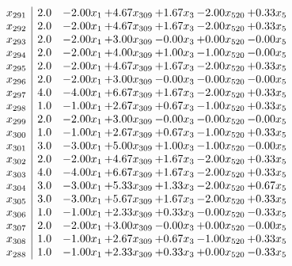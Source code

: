 \documentclass[8pt]{article}
\begin{document}
\[\begin{array}{c| c c@{\hskip 2pt} c@{\hskip 2pt} c@{\hskip 2pt} c@{\hskip 2pt} c@{\hskip 2pt} }
 x_{291}   &  2.0 & -2.00 x_{1} & +  4.67 x_{309} & +  1.67 x_{3} & -2.00 x_{520} & +  0.33 x_{5}\\
 x_{292}   &  2.0 & -2.00 x_{1} & +  4.67 x_{309} & +  1.67 x_{3} & -2.00 x_{520} & +  0.33 x_{5}\\
 x_{293}   &  2.0 & -2.00 x_{1} & +  3.00 x_{309} & -0.00 x_{3} & +  0.00 x_{520} & -0.00 x_{5}\\
 x_{294}   &  2.0 & -2.00 x_{1} & +  4.00 x_{309} & +  1.00 x_{3} & -1.00 x_{520} & -0.00 x_{5}\\
 x_{295}   &  2.0 & -2.00 x_{1} & +  4.67 x_{309} & +  1.67 x_{3} & -2.00 x_{520} & +  0.33 x_{5}\\
 x_{296}   &  2.0 & -2.00 x_{1} & +  3.00 x_{309} & -0.00 x_{3} & -0.00 x_{520} & -0.00 x_{5}\\
 x_{297}   &  4.0 & -4.00 x_{1} & +  6.67 x_{309} & +  1.67 x_{3} & -2.00 x_{520} & +  0.33 x_{5}\\
 x_{298}   &  1.0 & -1.00 x_{1} & +  2.67 x_{309} & +  0.67 x_{3} & -1.00 x_{520} & +  0.33 x_{5}\\
 x_{299}   &  2.0 & -2.00 x_{1} & +  3.00 x_{309} & -0.00 x_{3} & -0.00 x_{520} & -0.00 x_{5}\\
 x_{300}   &  1.0 & -1.00 x_{1} & +  2.67 x_{309} & +  0.67 x_{3} & -1.00 x_{520} & +  0.33 x_{5}\\
 x_{301}   &  3.0 & -3.00 x_{1} & +  5.00 x_{309} & +  1.00 x_{3} & -1.00 x_{520} & -0.00 x_{5}\\
 x_{302}   &  2.0 & -2.00 x_{1} & +  4.67 x_{309} & +  1.67 x_{3} & -2.00 x_{520} & +  0.33 x_{5}\\
 x_{303}   &  4.0 & -4.00 x_{1} & +  6.67 x_{309} & +  1.67 x_{3} & -2.00 x_{520} & +  0.33 x_{5}\\
 x_{304}   &  3.0 & -3.00 x_{1} & +  5.33 x_{309} & +  1.33 x_{3} & -2.00 x_{520} & +  0.67 x_{5}\\
 x_{305}   &  3.0 & -3.00 x_{1} & +  5.67 x_{309} & +  1.67 x_{3} & -2.00 x_{520} & +  0.33 x_{5}\\
 x_{306}   &  1.0 & -1.00 x_{1} & +  2.33 x_{309} & +  0.33 x_{3} & -0.00 x_{520} & -0.33 x_{5}\\
 x_{307}   &  2.0 & -2.00 x_{1} & +  3.00 x_{309} & -0.00 x_{3} & +  0.00 x_{520} & -0.00 x_{5}\\
 x_{308}   &  1.0 & -1.00 x_{1} & +  2.67 x_{309} & +  0.67 x_{3} & -1.00 x_{520} & +  0.33 x_{5}\\
 x_{288}   &  1.0 & -1.00 x_{1} & +  2.33 x_{309} & +  0.33 x_{3} & +  0.00 x_{520} & -0.33 x_{5}\\

\end{array}\]
\end{document}
